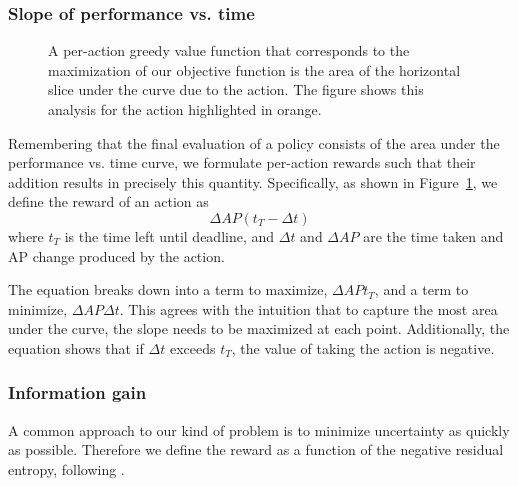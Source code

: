 \documentclass[runningheads]{llncs}
\begin{document}
\subsubsection{Slope of performance vs. time}
\begin{figure}[htb]
  \caption{\label{fig:rewards}A per-action greedy value function that corresponds to the maximization of our objective function is the area of the horizontal slice under the curve due to the action. The figure shows this analysis for the action highlighted in orange.}
\end{figure}

Remembering that the final evaluation of a policy consists of the area under the performance vs. time curve, we formulate per-action rewards such that their addition results in precisely this quantity.
Specifically, as shown in Figure~\ref{fig:rewards}, we define the reward of an action as
\begin{equation}\label{eq:advanced}
\Delta AP (t_T-\Delta t)
\end{equation}
where $t_T$ is the time left until deadline, and $\Delta t$ and $\Delta AP$ are the time taken and AP change produced by the action.

The equation breaks down into a term to maximize, $\Delta AP t_T$, and a term to minimize, $\Delta AP \Delta t$.
This agrees with the intuition that to capture the most area under the curve, the slope needs to be maximized at each point.
Additionally, the equation shows that if $\Delta t$ exceeds $t_T$, the value of taking the action is negative.

\subsubsection{Information gain}
A common approach to our kind of problem is to minimize uncertainty as quickly as possible.
Therefore we define the reward as a function of the negative residual entropy, following \cite{Gao2011}.
\end{document}
